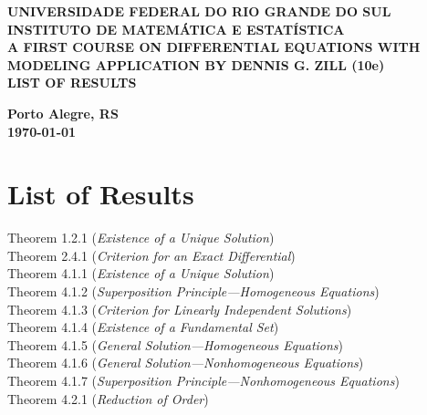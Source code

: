 \documentclass[12pt]{article}
\begin{document}
\begin{center}
    \textbf{\large UNIVERSIDADE FEDERAL DO RIO GRANDE DO SUL} \\
    \textbf{\large INSTITUTO DE MATEMÁTICA E ESTATÍSTICA} \\
    \vspace{3cm}
    \textbf{\Large A FIRST COURSE ON DIFFERENTIAL EQUATIONS WITH MODELING APPLICATION BY DENNIS G. ZILL (10e)} \\
    \vspace{1cm}
    \textbf{\large LIST OF RESULTS} \\
    \vspace{3cm}
    
    \author{Leonardo Suarez}
    
    \vfill
    \textbf{\large Porto Alegre, RS} \\
    \textbf{\large\today} \\
\end{center}\newpage

\section*{List of Results}

\noindent Theorem 1.2.1 (\emph{Existence of a Unique Solution})  \\
Theorem 2.4.1 (\emph{Criterion for an Exact Differential})  \\
Theorem 4.1.1 (\emph{Existence of a Unique Solution})  \\
Theorem 4.1.2 (\emph{Superposition Principle—Homogeneous Equations})  \\
Theorem 4.1.3 (\emph{Criterion for Linearly Independent Solutions})  \\
Theorem 4.1.4 (\emph{Existence of a Fundamental Set})  \\
Theorem 4.1.5 (\emph{General Solution—Homogeneous Equations})  \\
Theorem 4.1.6 (\emph{General Solution—Nonhomogeneous Equations})  \\
Theorem 4.1.7 (\emph{Superposition Principle—Nonhomogeneous Equations})  \\
Theorem 4.2.1 (\emph{Reduction of Order})  \\

\vspace{0.5em}
\end{document}
